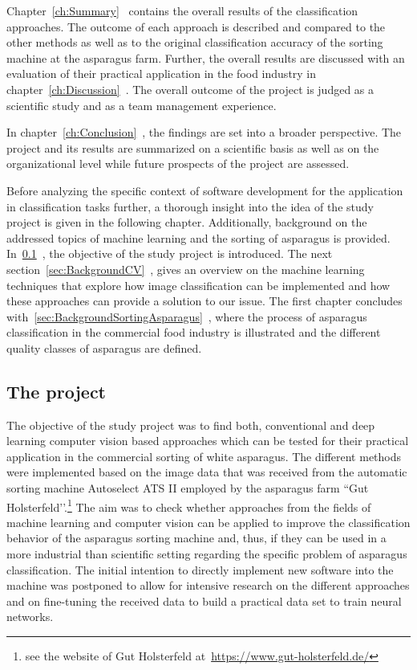 Chapter~\ref{ch:Summary}~ contains the overall results of the classification approaches. The outcome of each approach is described and compared to the other methods as well as to the original classification accuracy of the sorting machine at the asparagus farm. Further, the overall results are discussed with an evaluation of their practical application in the food industry in chapter~\ref{ch:Discussion}~. The overall outcome of the project is judged as a scientific study and as a team management experience.

In chapter~\ref{ch:Conclusion}~, the findings are set into a broader perspective. The project and its results are summarized on a scientific basis as well as on the organizational level while future prospects of the project are assessed.

\bigskip
Before analyzing the specific context of software development for the application in classification tasks further, a thorough insight into the idea of the study project is given in the following chapter. Additionally, background on the addressed topics of machine learning and the sorting of asparagus is provided.
In~\ref{sec:Project}~, the objective of the study project is introduced. The next section~\ref{sec:BackgroundCV}~, gives an overview on the machine learning techniques that explore how image classification can be implemented and how these approaches can provide a solution to our issue. The first chapter concludes with~\ref{sec:BackgroundSortingAsparagus}~, where the process of asparagus classification in the commercial food industry is illustrated and the different quality classes of asparagus are defined.


\subsection{The project}
\label{sec:Project}

The objective of the study project was to find both, conventional and deep learning computer vision based approaches which can be tested for their practical application in the commercial sorting of white asparagus. The different methods were implemented based on the image data that was received from the automatic sorting machine Autoselect ATS II employed by the asparagus farm ``Gut Holsterfeld’’.\footnote{see the website of Gut Holsterfeld at~\url{https://www.gut-holsterfeld.de/}} The aim was to check whether approaches from the fields of machine learning and computer vision can be applied to improve the classification behavior of the asparagus sorting machine and, thus, if they can be used in a more industrial than scientific setting regarding the specific problem of asparagus classification. The initial intention to directly implement new software into the machine was postponed to allow for intensive research on the different approaches and on fine-tuning the received data to build a practical data set to train neural networks.

